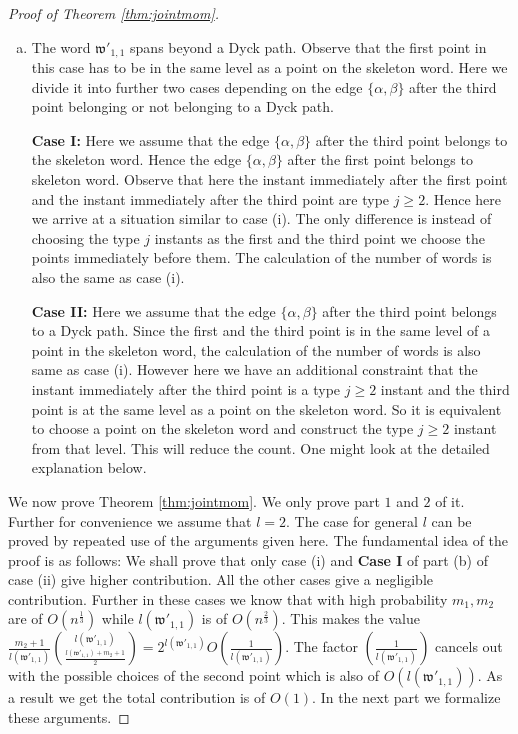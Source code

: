 \documentclass[12pt]{article}
\numberwithin{equation}{section}
\numberwithin{equation}{section}
\theoremstyle{definition}
\renewcommand{\1}{\bf 1}
\begin{document}
\begin{proof}[Proof of Theorem \ref{thm:jointmom}]
\begin{enumerate}[(a)]
\item The word $\mathfrak{w}'_{1,1}$ spans beyond a Dyck path. Observe that the first point in this case has to be in the same level as a point on the skeleton word. Here we divide it into further two cases depending on the edge $\{\alpha,\beta\}$ after the third point belonging or not belonging to a Dyck path.   

\noindent 
\textbf{Case I:} Here we assume that the edge $\{ \alpha, \beta \}$ after the third point belongs to the skeleton word. Hence the edge $\{ \alpha,\beta \}$ after the first point belongs to skeleton word.  Observe that here the instant immediately after the first point and the instant immediately after the third point are type $j \ge 2$. Hence here we arrive at a situation similar to case (i). The only difference is instead of choosing the type $j$ instants as the first and the third point we choose the points immediately before them. The calculation of the number of words is also the same as case (i). 

\noindent 
\textbf{Case II:} Here we assume that the edge $\{ \alpha, \beta \}$ after the third point belongs to a Dyck path. Since the first and the third point is in the same level of a point in the skeleton word, the calculation of the number of words is also same as case (i). However here we have an additional constraint that the instant immediately after the third point is a type $j \ge 2$ instant and the third point is at the same level as a point on the skeleton word. So it is equivalent to choose a point on the skeleton word and construct the type $j \ge 2$ instant from that level. This will reduce the count. One might look at the detailed explanation below. 
\end{enumerate}
We now prove Theorem \ref{thm:jointmom}. We only prove part $1$ and $2$ of it. Further for convenience we assume that $l=2$. The case for general $l$ can be proved by repeated use of the arguments given here. The fundamental idea of the proof is as follows: We shall prove that only case (i) and \textbf{Case I} of part (b) of case (ii) give higher contribution. All the other cases give a negligible contribution. Further in these cases we know that with high probability $m_{1}, m_{2}$ are of $O(n^{\frac{1}{3}})$ while $l(\mathfrak{w}'_{1,1})$ is of $O(n^{\frac{2}{3}})$. This makes the value 
$\frac{m_{2}+1}{l(\mathfrak{w}'_{1,1})}\binom{l(\mathfrak{w}'_{1,1})}{\frac{l(\mathfrak{w}'_{1,1})+m_{2}+1}{2}}= 2^{l(\mathfrak{w}'_{1,1})}O\left(\frac{1}{l(\mathfrak{w}'_{1,1})}\right)$. The factor $\left(\frac{1}{l(\mathfrak{w}'_{1,1})}\right)$ cancels out with the possible choices of the second point which is also of $O(l(\mathfrak{w}'_{1,1}))$. As a result we get the total contribution is of $O(1)$. In the next part we formalize these arguments.


\end{proof}
\end{document}
